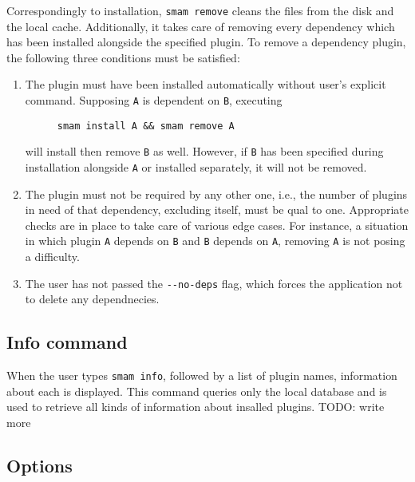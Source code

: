 Correspondingly to installation, \verb|smam remove| cleans the files from the disk and the local cache.
Additionally, it takes care of removing every dependency which has been installed alongside the specified plugin.
To remove a dependency plugin, the following three conditions must be satisfied:
\begin{enumerate}
\item
The plugin must have been installed automatically without user's explicit command.
Supposing \verb|A| is dependent on \verb|B|, executing

\begin{figure}[htp]
\centering
\verb|smam install A && smam remove A|
\end{figure}

will install then remove \verb|B| as well.
However, if \verb|B| has been specified during installation alongside \verb|A| or installed separately, it will not be removed.

\item
The plugin must not be required by any other one, i.e., the number of plugins in need of that dependency, excluding itself, must be qual to one.
Appropriate checks are in place to take care of various edge cases.
For instance, a situation in which plugin \verb|A| depends on \verb|B| and \verb|B| depends on \verb|A|, removing \verb|A| is not posing a difficulty.

\item
The user has not passed the \verb|--no-deps| flag, which forces the application not to delete any dependnecies.

\end{enumerate}

\subsection{Info command}

When the user types \verb|smam info|, followed by a list of plugin names, information about each is displayed.
This command queries only the local database and is used to retrieve all kinds of information about insalled plugins.
TODO: write more

\subsection{Options}

